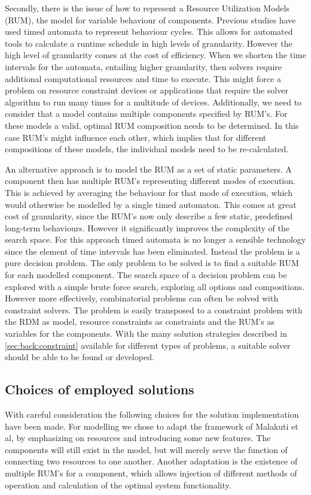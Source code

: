 Secondly, there is the issue of how to represent a Resource Utilization Models (RUM)\cite{steven-te-brinke}, the model for variable behaviour of components. Previous studies \cite{rum_basis_89, steven-te-brinke} have used timed automata to represent behaviour cycles. This allows for automated tools to calculate a runtime schedule in high levels of granularity. However the high level of granularity comes at the cost of efficiency. When we shorten the time intervals for the automata, entailing higher granularity, then solvers require additional computational resources and time to execute. This might force a problem on resource constraint devices or applications that require the solver algorithm to run many times for a multitude of devices. Additionally, we need to consider that a model contains multiple components specified by RUM's. For these models a valid, optimal RUM composition needs to be determined. In this case RUM's might influence each other, which implies that for different compositions of these models, the individual models need to be re-calculated.

An alternative approach is to model the RUM as a set of static parameters. A component then has multiple RUM's representing different modes of execution. This is achieved by averaging the behaviour for that mode of execution, which would otherwise be modelled by a single timed automaton. This comes at great cost of granularity, since the RUM's now only describe a few static, predefined long-term behaviours. However it significantly improves the complexity of the search space. For this approach timed automata is no longer a sensible technology since the element of time intervals has been eliminated. Instead the problem is a pure decision problem\cite{decision_problem}. The only problem to be solved is to find a suitable RUM for each modelled component. The search space of a decision problem can be explored with a simple brute force search, exploring all options and compositions. However more effectively, combinatorial problems can often be solved with constraint solvers. The problem is easily transposed to a constraint problem with the RDM as model, resource constraints as constraints and the RUM's as variables for the components. With the many solution strategies described in \ref{sec:back:constraint} available for different types of problems, a suitable solver should be able to be found or developed.

\subsection{Choices of employed solutions}
\label{sub:choices}
With careful consideration the following choices for the solution implementation have been made. For modelling we chose to adapt the framework of Malakuti et al\cite{steven_te_brinke}, by emphasizing on resources and introducing some new features. The components will still exist in the model, but will merely serve the function of connecting two resources to one another. Another adaptation is the existence of multiple RUM's for a component, which allows injection of different methods of operation and calculation of the optimal system functionality.

